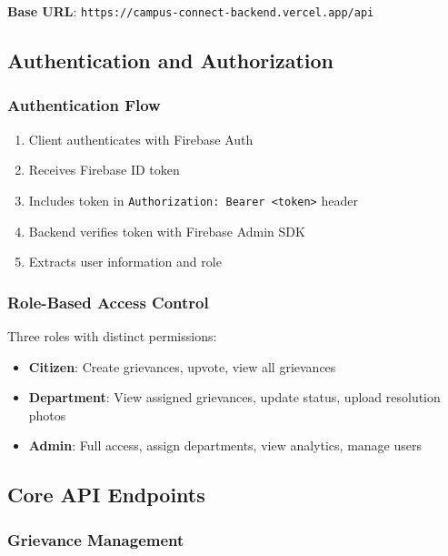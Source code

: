 \documentclass[12pt,a4paper]{article}
\begin{document}
\textbf{Base URL}: \texttt{https://campus-connect-backend.vercel.app/api}

\subsection{Authentication and Authorization}

\subsubsection{Authentication Flow}
\begin{enumerate}
    \item Client authenticates with Firebase Auth
    \item Receives Firebase ID token
    \item Includes token in \texttt{Authorization: Bearer <token>} header
    \item Backend verifies token with Firebase Admin SDK
    \item Extracts user information and role
\end{enumerate}

\subsubsection{Role-Based Access Control}

Three roles with distinct permissions:
\begin{itemize}
    \item \textbf{Citizen}: Create grievances, upvote, view all grievances
    \item \textbf{Department}: View assigned grievances, update status, upload resolution photos
    \item \textbf{Admin}: Full access, assign departments, view analytics, manage users
\end{itemize}

\subsection{Core API Endpoints}

\subsubsection{Grievance Management}
\end{document}
